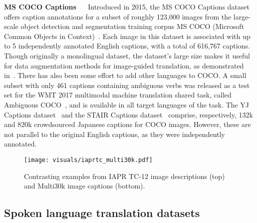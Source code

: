 \documentclass{svjour3}
\newcommand{\element}[1]{\noindent\textbf{#1} ~~}
\begin{document}
        \label{sec:datasets:mscoco}            
        \element{MS COCO Captions}
            Introduced in 2015, the MS COCO Captions dataset~\citep{chen-microsoft-2015} offers caption annotations for a subset of roughly 123,000 images from the large-scale object detection and segmentation training corpus MS COCO (Microsoft Common Objects in Context)~\citep{fleet-microsoft-2014}. Each image in this dataset is associated with up to 5 independently annotated English captions, with a total of 616,767 captions. Though originally a monolingual dataset, the dataset's large size makes it useful for data augmentation methods for image-guided translation, as demonstrated in~\citet{gronroos-memad-2018}. There has also been some effort to add other languages to COCO. A small subset with only 461 captions containing ambiguous verbs was released as a test set for the WMT 2017 multimodal machine translation shared task, called Ambiguous COCO~\citep{elliott-findings-2017}, and is available in all target languages of the task. The YJ Captions dataset~\citep{miyazaki-cross-2016} and the STAIR Captions dataset~\citep{yoshikawa-stair-2017} comprise, respectively, 132k and 820k crowdsourced Japanese captions for COCO images. However, these are not parallel to the original English captions, as they were independently annotated.




       \begin{figure}[t]
            \centering
            \texttt{[image: visuals/iaprtc\_multi30k.pdf]}
            \caption{Contrasting examples from IAPR TC-12 image descriptions (top) and Multi30k image captions (bottom).}
            \label{fig:datasets:igt}
        \end{figure}
        
    


    \subsection{Spoken language translation datasets}
    \label{sec:datasets:ted}
        
\end{document}
